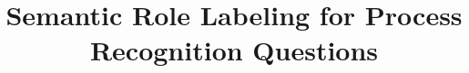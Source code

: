 \documentclass[11pt,a4paper]{article}
\title{Semantic Role Labeling for Process Recognition Questions}
\date{}
\begin{document}
\maketitle









\small

\end{document}
